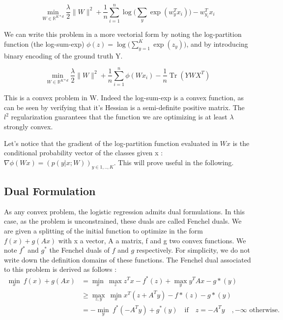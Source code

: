 \documentclass{article}
\DeclareMathOperator{\Tr}{Tr}
\begin{document}
\begin{equation}
	\label{primal}
	\min_{W \in \mathbb{R}^{K*d}} \frac{\lambda}{2}\|W\|^2 + \frac{1}{n} \sum_{i=1}^n \log \bigg(\sum_y \exp(w_y^Tx_i)\bigg) - w_{y_i}^Tx_i 
\end{equation} 

We can write this problem in a more vectorial form by noting the log-partition function (the log-sum-exp) $\phi(z) = \log \big(\sum_{y=1}^K \exp(z_y)\big)$, and by introducing binary encoding of the ground truth Y. 

\begin{equation}
	\label{primal}
	\min_{W \in \mathbb{R}^{K*d}} \frac{\lambda}{2}\|W\|^2 + \frac{1}{n} \sum_{i=1}^n \phi(Wx_i) - \frac{1}{n}\Tr(Y W X^T) 
\end{equation} 

This is a convex problem in W. Indeed the log-sum-exp is a convex function, as can be seen by verifying that it's Hessian is a semi-definite positive matrix. The $l^2$ regularization guarantees that the function we are optimizing is at least $\lambda$ strongly convex. 

Let's notice that the gradient of the log-partition function evaluated in $Wx$ is the conditional probability vector of the classes given x : $\nabla\phi(Wx) = (p(y|x;W))_{y\in {1,..,K}}$. This will prove useful in the following.

\subsection{Dual Formulation}

As any convex problem, the logistic regression admits dual formulations. In this case, as the problem is unconstrained, these duals are called Fenchel duals. We are given a splitting of the initial function to optimize in the form $f(x) + g(Ax)$ with x a vector, A a matrix, f and g two convex functions. We note $f^*$ and $g^*$ the Fenchel duals of $f$ and $g$ respectively. For simplicity, we do not write down the definition domains of these functions. The Fenchel dual associated to this problem is derived as follows :
\begin{align*}
	 \min_x \ f(x) + g(Ax) & = \min_x \ \max_z z^Tx - f^*(z) + \max_y y^T A x - g*(y) \\
	 	& \geq \max_{z, y} \  \min_x x^T(z + A^T y) - f*(z) - g*(y) \\
		& =  - \min_y \   f^*(-A^Ty) + g^*(y) \quad \textrm{if} \quad z=-A^T y \quad , -\infty \textrm{ otherwise.}\\
\end{align*}
\end{document}
